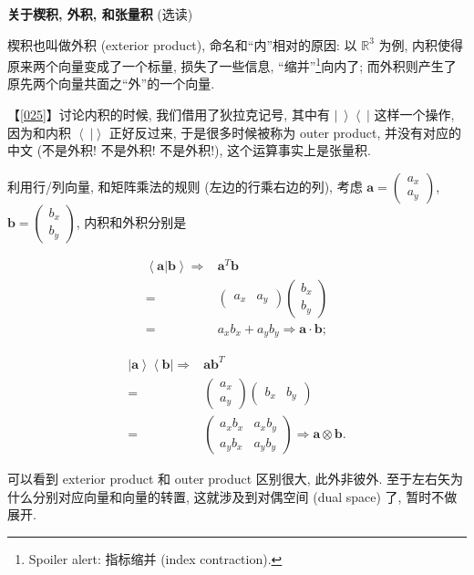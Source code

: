 \begin{newquote}

\textbf{关于楔积, 外积, 和张量积} (选读)

楔积也叫做外积 (exterior product), 命名和``内''相对的原因: 以
\(\mathbb{R}^3\) 为例, 内积使得原来两个向量变成了一个标量,
损失了一些信息, ``缩并''\footnote{Spoiler alert: 指标缩并 (index
  contraction).}向内了;
而外积则产生了原先两个向量共面之``外''的一个向量.

【\ref{025}】讨论内积的时候, 我们借用了狄拉克记号, 其中有
\(\left|\ \right>\left<\ \right|\) 这样一个操作, 因为和内积
\(\left<\ \right|\left.\right>\) 正好反过来, 于是很多时候被称为 outer
product, 并没有对应的中文 (不是外积! 不是外积! 不是外积!),
这个运算事实上是张量积.

利用行/列向量, 和矩阵乘法的规则 (左边的行乘右边的列), 考虑
$\boldsymbol{a}=\begin{pmatrix}a_x\\a_y\end{pmatrix}$,
$\boldsymbol{b}=\begin{pmatrix}b_x\\b_y\end{pmatrix}$, 内积和外积分别是

\begin{align*}
\left<{\boldsymbol{a}}\right|\left.\boldsymbol{b}\right>\Rightarrow&\boldsymbol{a}^T\boldsymbol{b}\\
=&\begin{pmatrix}a_x&a_y\end{pmatrix}\begin{pmatrix}b_x\\b_y\end{pmatrix}\\
=&a_xb_x+a_yb_y\Rightarrow\boldsymbol{a}\cdot\boldsymbol{b};
\end{align*}

\begin{align*}
\left|{\boldsymbol{a}}\right>\left<{\boldsymbol{b}}\right|\Rightarrow&\boldsymbol{a}\boldsymbol{b}^T\\
=&\begin{pmatrix}a_x\\a_y\end{pmatrix}\begin{pmatrix}b_x&b_y\end{pmatrix}\\
=&\begin{pmatrix}a_xb_x&a_xb_y\\a_yb_x&a_yb_y\end{pmatrix}\Rightarrow{\boldsymbol{a}}\otimes{\boldsymbol{b}}.
\end{align*}

可以看到 exterior product 和 outer product 区别很大, 此外非彼外.
至于左右矢为什么分别对应向量和向量的转置, 这就涉及到对偶空间 (dual
space) 了, 暂时不做展开.

\end{newquote}